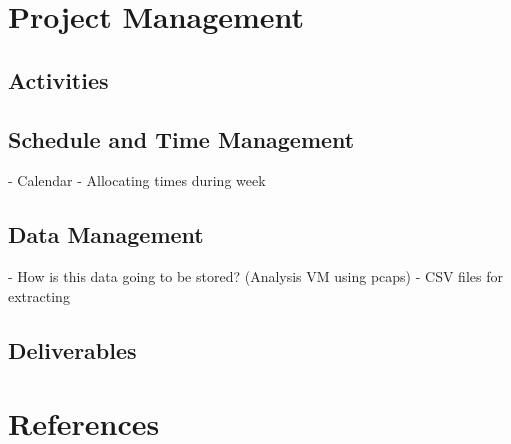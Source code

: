 \documentclass[a4paper,12pt,oneside]{book}			%
\begin{document}
\chapter{Project Management}\label{ch:project management}
\section{Activities}\label{sec:activities}
\section{Schedule and Time Management}\label{sec:time management}
- Calendar
- Allocating times during week
\section{Data Management}\label{sec:data management}
- How is this data going to be stored? (Analysis VM using pcaps)
- CSV files for extracting
\section{Deliverables}\label{sec: deliverables}



\chapter{References}

\printbibliography
\end{document}
